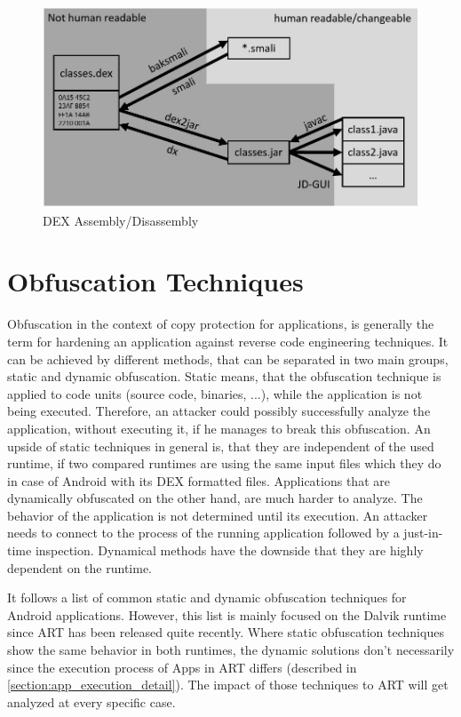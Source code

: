 \begin{figure}[htb]
  \includegraphics[width=\textwidth]{figures/dex_disassembly}
  \caption[DEX Assembly/Disassembly]{DEX Assembly/Disassembly}
  \label{fig:dex_disassembly}
\end{figure}


\section{Obfuscation Techniques}\label{section:obfuscation_techniques}
Obfuscation in the context of copy protection for applications,
is generally the term for hardening an application against
reverse code engineering techniques. It can be achieved by different methods,
that can be separated in two main groups, static and dynamic obfuscation.
Static means, that the obfuscation technique is applied to code units (source
code, binaries, ...), while the application is not being executed. Therefore, an
attacker could possibly successfully analyze the application, without executing it, if he manages to break this obfuscation. An upside of static techniques in general is, that they are independent of the used runtime, if two compared runtimes are using the same input files which they do in case of Android with its DEX formatted files.
Applications that are dynamically obfuscated on the other hand, are much harder to analyze. The behavior
of the application is not determined until its execution. An attacker needs to connect to the process of the running application followed by a just-in-time inspection. Dynamical methods have the downside that they are highly dependent on the runtime.

It follows a list of common static and dynamic obfuscation techniques
for Android applications. However, this list is mainly focused on
the Dalvik runtime since ART has been released quite recently.
Where static obfuscation techniques show the same behavior in both
runtimes, the dynamic solutions don't necessarily since the execution process
of Apps in ART differs (described in \autoref{section:app_execution_detail}).
The impact of those techniques to ART will get analyzed at every specific case.


